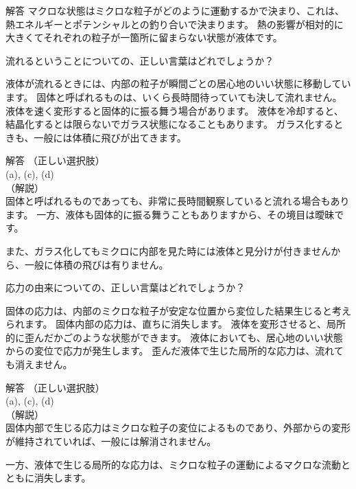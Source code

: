 \documentclass[uplatex,dvipdfmx,a4paper,11pt]{jsarticle}
\begin{document}
\begin{qlist}
\begin{itembox}[l]{解答}
            マクロな状態はミクロな粒子がどのように運動するかで決まり、これは、熱エネルギーとポテンシャルとの釣り合いで決まります。
            熱の影響が相対的に大きくてそれぞれの粒子が一箇所に留まらない状態が液体です。
        \end{itembox}
	\qitem 流れるということについての、正しい言葉はどれでしょうか？
		\begin{qlist2}
			\qitem 液体が流れるときには、内部の粒子が瞬間ごとの居心地のいい状態に移動しています。
			\qitem 固体と呼ばれるものは、いくら長時間待っていても決して流れません。
			\qitem 液体を速く変形すると固体的に振る舞う場合があります。
			\qitem 液体を冷却すると、結晶化するとは限らないでガラス状態になることもあります。
			\qitem ガラス化するときも、一般には体積に飛びが出てきます。
		\end{qlist2}	
        \vspace{3mm}
        \begin{itembox}[l]{解答}
            （正しい選択肢）\\
            (a), (c), (d)\\
            （解説）\\
            固体と呼ばれるものであっても、非常に長時間観察していると流れる場合もあります。
            一方、液体も固体的に振る舞うこともありますから、その境目は曖昧です。
            
            また、ガラス化してもミクロに内部を見た時には液体と見分けが付きませんから、一般に体積の飛びは有りません。
        \end{itembox}
	\qitem 応力の由来についての、正しい言葉はどれでしょうか？
		\begin{qlist2}
			\qitem 固体の応力は、内部のミクロな粒子が安定な位置から変位した結果生じると考えられます。
			\qitem 固体内部の応力は、直ちに消失します。
			\qitem 液体を変形させると、局所的に歪んだかごのような状態ができます。
			\qitem 液体においても、居心地のいい状態からの変位で応力が発生します。
			\qitem 歪んだ液体で生じた局所的な応力は、流れても消えません。
		\end{qlist2}
        \vspace{3mm}
        \begin{itembox}[l]{解答}
            （正しい選択肢）\\
            (a), (c), (d)\\
            （解説）\\
            固体内部で生じる応力はミクロな粒子の変位によるものであり、外部からの変形が維持されていれば、一般には解消されません。
            
            一方、液体で生じる局所的な応力は、ミクロな粒子の運動によるマクロな流動とともに消失します。
        \end{itembox}
\end{qlist}
\end{document}

